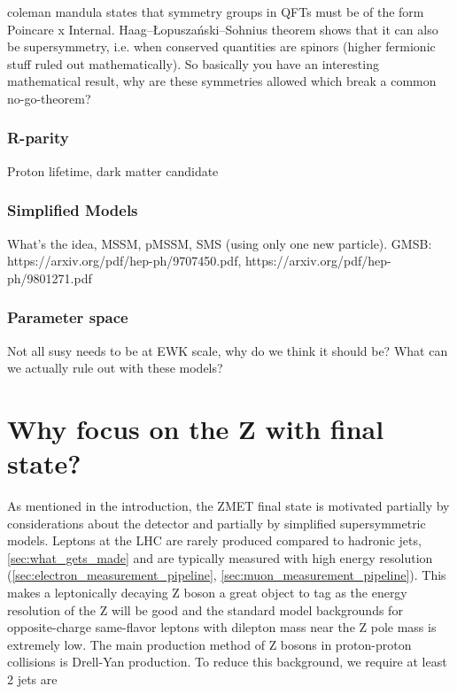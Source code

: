       coleman mandula states that symmetry groups in QFTs must be of the form Poincare x Internal. Haag–Łopuszański–Sohnius theorem shows that it can also be supersymmetry, i.e. when conserved quantities are spinors (higher fermionic stuff ruled out mathematically). So basically you have an interesting mathematical result, why are these symmetries allowed which break a common no-go-theorem?
    \subsubsection{R-parity} \label{sec:r-parity}
      Proton lifetime, dark matter candidate
    \subsubsection{Simplified Models}
      What's the idea, MSSM, pMSSM, SMS (using only one new particle).
      GMSB: https://arxiv.org/pdf/hep-ph/9707450.pdf, https://arxiv.org/pdf/hep-ph/9801271.pdf
    \subsubsection{Parameter space}
      Not all susy needs to be at EWK scale, why do we think it should be? What can we actually rule out with these models?
\section{Why focus on the Z with \MET final state?}
  As mentioned in the introduction, the ZMET final state is motivated partially by considerations about the detector and partially by simplified supersymmetric models. Leptons at the LHC are rarely produced compared to hadronic jets,\ref{sec:what_gets_made} and are typically measured with high energy resolution (\ref{sec:electron_measurement_pipeline}, \ref{sec:muon_measurement_pipeline}). This makes a leptonically decaying Z boson a great object to tag as the energy resolution of the Z will be good and the standard model backgrounds for opposite-charge same-flavor leptons with dilepton mass near the Z pole mass is extremely low. The main production method of Z bosons in proton-proton collisions is Drell-Yan production. To reduce this background, we require at least 2 jets are 

